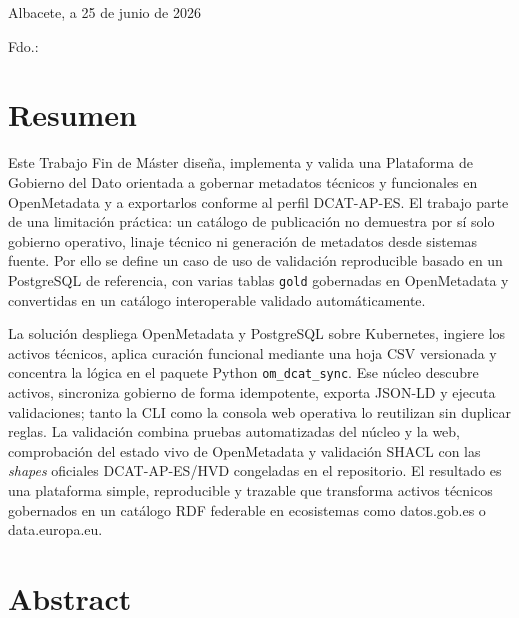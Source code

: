 \vspace*{2cm}
\begin{center}
Albacete, a 25 de junio de 2026

\vskip3cm

Fdo.: \autor
\end{center}
\clearpage

\cleardoublepage
\thispagestyle{plain}
\chapter*{Resumen}
\vspace*{-1.0cm}

Este Trabajo Fin de Máster diseña, implementa y valida una Plataforma de Gobierno del Dato orientada a gobernar metadatos técnicos y funcionales en OpenMetadata y a exportarlos conforme al perfil DCAT-AP-ES. El trabajo parte de una limitación práctica: un catálogo de publicación no demuestra por sí solo gobierno operativo, linaje técnico ni generación de metadatos desde sistemas fuente. Por ello se define un caso de uso de validación reproducible basado en un PostgreSQL de referencia, con varias tablas \texttt{gold} gobernadas en OpenMetadata y convertidas en un catálogo interoperable validado automáticamente.

La solución despliega OpenMetadata y PostgreSQL sobre Kubernetes, ingiere los activos técnicos, aplica curación funcional mediante una hoja CSV versionada y concentra la lógica en el paquete Python \texttt{om\_dcat\_sync}. Ese núcleo descubre activos, sincroniza gobierno de forma idempotente, exporta JSON-LD y ejecuta validaciones; tanto la CLI como la consola web operativa lo reutilizan sin duplicar reglas. La validación combina pruebas automatizadas del núcleo y la web, comprobación del estado vivo de OpenMetadata y validación SHACL con las \emph{shapes} oficiales DCAT-AP-ES/HVD congeladas en el repositorio. El resultado es una plataforma simple, reproducible y trazable que transforma activos técnicos gobernados en un catálogo RDF federable en ecosistemas como datos.gob.es o data.europa.eu.
\clearpage

\cleardoublepage
\thispagestyle{plain}
\chapter*{Abstract}
\vspace*{-1.0cm}

